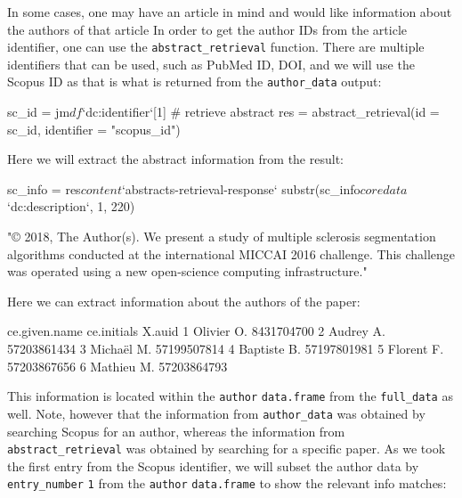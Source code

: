 In some cases, one may have an article in mind and would like
information about the authors of that article In order to get the author
IDs from the article identifier, one can use the
\texttt{abstract\_retrieval} function. There are multiple identifiers
that can be used, such as PubMed ID, DOI, and we will use the Scopus ID
as that is what is returned from the \texttt{author\_data} output:

\begin{Schunk}
\begin{Sinput}
sc_id = jm$df$`dc:identifier`[1]
# retrieve abstract 
res = abstract_retrieval(id = sc_id, identifier = "scopus_id")
\end{Sinput}
\end{Schunk}

Here we will extract the abstract information from the result:

\begin{Schunk}
\begin{Sinput}
sc_info = res$content$`abstracts-retrieval-response`
substr(sc_info$coredata$`dc:description`, 1, 220)
\end{Sinput}
\begin{Soutput}
[1] "© 2018, The Author(s). We present a study of multiple sclerosis segmentation algorithms conducted at the international MICCAI 2016 challenge. This challenge was operated using a new open-science computing infrastructure."
\end{Soutput}
\end{Schunk}

Here we can extract information about the authors of the paper:

\begin{Schunk}
\begin{Soutput}
  ce.given.name ce.initials      X.auid
1       Olivier          O.  8431704700
2        Audrey          A. 57203861434
3       Michaël          M. 57199507814
4      Baptiste          B. 57197801981
5       Florent          F. 57203867656
6       Mathieu          M. 57203864793
\end{Soutput}
\end{Schunk}

This information is located within the \texttt{author}
\texttt{data.frame} from the \texttt{full\_data} as well. Note, however
that the information from \texttt{author\_data} was obtained by
searching Scopus for an author, whereas the information from
\texttt{abstract\_retrieval} was obtained by searching for a specific
paper. As we took the first entry from the Scopus identifier, we will
subset the author data by \texttt{entry\_number} \texttt{1} from the
\texttt{author} \texttt{data.frame} to show the relevant info matches:

